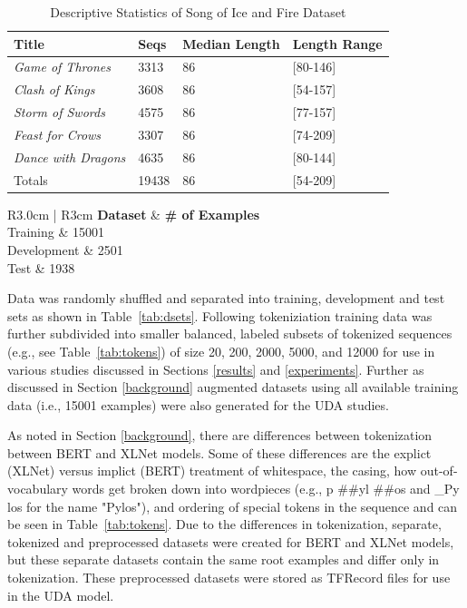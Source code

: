 \documentclass[twoside,twocolumn,10pt]{article}
\begin{document}
\begin{table}[!htb]
	\caption{Descriptive Statistics of Song of Ice and Fire Dataset}\label{tab:data}
	\centering
	\begin{tabular}{p{3.0cm} p{1cm} p{1.5cm} p{3.0cm}}
		\toprule
		Title & Seqs & Median Length & Length Range \\
		\midrule
		{\it Game of Thrones} & 3313 & 86 & [80-146]  \\
		{\it Clash of Kings} & 3608 & 86 & [54-157] \\
		{\it Storm of Swords} & 4575 & 86 & [77-157]  \\
		{\it Feast for Crows} & 3307 & 86 & [74-209]  \\
		{\it Dance with Dragons} & 4635 & 86 & [80-144]  \\
		\midrule
		Totals & 19438 & 86 & [54-209]  \\
		\bottomrule
	\end{tabular}
\end{table}

\begin{table}
	\caption{Division of Dataset}\label{tab:dsets}
	\centering
	\begin{tabular}{R{3.0cm} | R{3cm}}
		\toprule
		\textbf{Dataset} & \textbf{\# of Examples  }\\
		\midrule
		Training  & 15001  \\
		Development  & 2501   \\
		Test  & 1938   \\
		\bottomrule
	\end{tabular}
\end{table}

Data was randomly shuffled and separated into training, development and test sets as shown in Table~\ref{tab:dsets}. Following tokeniziation training data was further subdivided into smaller balanced, labeled subsets of tokenized sequences (e.g., see Table~\ref{tab:tokens}) of  size 20, 200, 2000, 5000, and 12000 for use in various studies discussed in Sections \ref{results} and \ref{experiments}. Further as discussed in Section \ref{background} augmented datasets using all available training data (i.e., 15001 examples) were also generated for the UDA studies.

As noted in Section \ref{background}, there are differences between tokenization between BERT and XLNet models. Some of these differences are the explict (XLNet) versus implict (BERT) treatment of whitespace, the casing, how out-of-vocabulary words get broken down into wordpieces (e.g., p \#\#yl \#\#os and \_Py los for the name "Pylos"), and ordering of special tokens in the sequence and can be seen in Table~\ref{tab:tokens}. Due to the differences in tokenization, separate, tokenized and preprocessed datasets were created for BERT and XLNet models, but these separate datasets contain the same root examples and differ only in tokenization. These preprocessed datasets were stored as TFRecord files for use in the UDA model.
\end{document}
